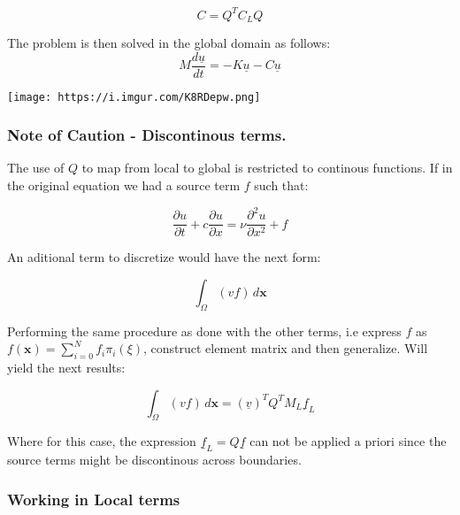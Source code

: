 \documentclass[
]{scrartcl}
\begin{document}
\begin{equation}
C = Q^{T}C_LQ    
\end{equation}

The problem is then solved in the global domain as follows:
\begin{equation}
M\frac{d\underline{u}}{dt}=-K\underline{u}-C\underline{u}
\end{equation}

\texttt{[image: https://i.imgur.com/K8RDepw.png]}

\hypertarget{note-of-caution---discontinous-terms.}{%
\subsubsection{Note of Caution - Discontinous
terms.}\label{note-of-caution---discontinous-terms.}}

The use of \(Q\) to map from local to global is restricted to continous
functions. If in the original equation we had a source term \(f\) such
that:

\begin{equation}
\frac{\partial{u}}{\partial{t}} + c \frac{\partial{u}}{\partial{x}} =  \nu \frac{\partial^{2}u}{\partial{x}^{2}}+f
\end{equation}

An aditional term to discretize would have the next form:

\begin{equation}
        \int_{\Omega} (v f) \,d\textbf{x}        
\end{equation}

Performing the same procedure as done with the other terms, i.e express
\(f\) as \(f(\textbf{x})=\sum_{i=0}^{N}f_{i} \pi_{i}(\xi)\), construct
element matrix and then generalize. Will yield the next results:

\begin{equation}
        \int_{\Omega} (v f) \,d\textbf{x} = (\underline{v})^{T}Q^{T}M_L\underline{f}_L        
\end{equation}

Where for this case, the expression \(\underline{f}_L=Q\underline{f}\)
can not be applied a priori since the source terms might be discontinous
across boundaries.

\hypertarget{working-in-local-terms}{%
\subsubsection{Working in Local terms}\label{working-in-local-terms}}
\end{document}
